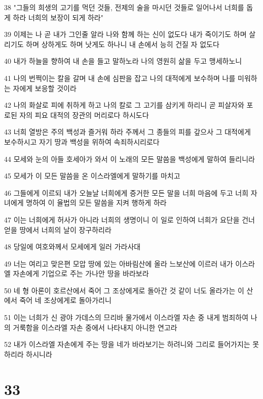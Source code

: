 \par 38 "그들의 희생의 고기를 먹던 것들, 전제의 술을 마시던 것들로 일어나서 너희를 돕게 하라 너희의 보장이 되게 하라"
\par 39 이제는 나 곧 내가 그인줄 알라 나와 함께 하는 신이 없도다 내가 죽이기도 하며 살리기도 하며 상하게도 하며 낫게도 하나니 내 손에서 능히 건질 자 없도다
\par 40 내가 하늘을 향하여 내 손을 들고 말하노라 나의 영원히 삶을 두고 맹세하노니
\par 41 나의 번쩍이는 칼을 갈며 내 손에 심판을 잡고 나의 대적에게 보수하며 나를 미워하는 자에게 보응할 것이라
\par 42 나의 화살로 피에 취하게 하고 나의 칼로 그 고기를 삼키게 하리니 곧 피살자와 포로된 자의 피요 대적의 장관의 머리로다 하시도다
\par 43 너희 열방은 주의 백성과 즐거워 하라 주께서 그 종들의 피를 갚으사 그 대적에게 보수하시고 자기 땅과 백성을 위하여 속죄하시리로다
\par 44 모세와 눈의 아들 호세아가 와서 이 노래의 모든 말씀을 백성에게 말하여 들리니라
\par 45 모세가 이 모든 말씀을 온 이스라엘에게 말하기를 마치고
\par 46 그들에게 이르되 내가 오늘날 너희에게 증거한 모든 말을 너희 마음에 두고 너희 자녀에게 명하여 이 율법의 모든 말씀을 지켜 행하게 하라
\par 47 이는 너희에게 허사가 아니라 너희의 생명이니 이 일로 인하여 너희가 요단을 건너 얻을 땅에서 너희의 날이 장구하리라
\par 48 당일에 여호와께서 모세에게 일러 가라사대
\par 49 너는 여리고 맞은편 모압 땅에 있는 아바림산에 올라 느보산에 이르러 내가 이스라엘 자손에게 기업으로 주는 가나안 땅을 바라보라
\par 50 네 형 아론이 호르산에서 죽어 그 조상에게로 돌아간 것 같이 너도 올라가는 이 산에서 죽어 네 조상에게로 돌아가리니
\par 51 이는 너희가 신 광야 가데스의 므리바 물가에서 이스라엘 자손 중 내게 범죄하여 나의 거룩함을 이스라엘 자손 중에서 나타내지 아니한 연고라
\par 52 내가 이스라엘 자손에게 주는 땅을 네가 바라보기는 하려니와 그리로 들어가지는 못하리라 하시니라

\chapter{33}

